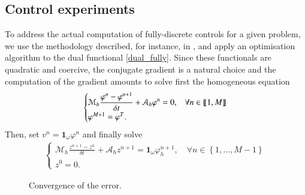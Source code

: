 \subsection{Control experiments}
%
To address the actual computation of fully-discrete controls for a given problem, we use the methodology described, for instance, in \cite{}, and apply an optimisation algorithm to the dual functional \eqref{dual_fully}. Since these functionals are quadratic and coercive, the conjugate gradient is a natural choice and the computation of the gradient amounts to solve first the homogeneous equation 
%
\begin{align}
	\begin{cases}
		\displaystyle\mathcal M_h \frac{\varphi^n-\varphi^{n+1}}{\delta t}+\mathcal A_h \varphi^n=0, & \forall n\in\llbracket 1,M\rrbracket
		\\
		\varphi^{M+1}=\varphi^T. 
	\end{cases}
\end{align}
%
Then, set $v^n=\mathbf{1}_\omega\varphi^n$ and finally solve 
%
\begin{align}\label{frac_heat_num}
	\begin{cases}
		\displaystyle\mathcal M_h \frac{z^{n+1}-z^n}{\delta t}+\mathcal A_h z^{n+1}=\mathbf{1}_\omega \varphi_h^{n+1}, \quad \forall n\in \left\{1,\ldots,M-1\right\}
		\\
		z^0=0. 
	\end{cases}
\end{align}
%

\begin{figure}
 \centering

\caption{Convergence of the error.}
\label{error}
\end{figure}


